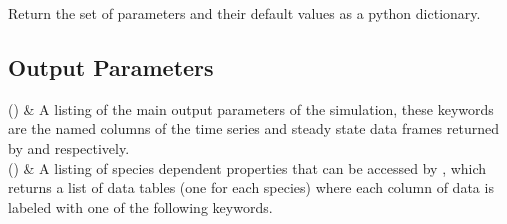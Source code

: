 \documentclass[letterpaper,10pt,english,openany,oneside]{sphinxmanual}
\begin{document}
\begin{fulllineitems}
\begin{fulllineitems}
\label{\detokenize{api/pytb.parameters.WrapParameters.get_params:pytb.parameters.WrapParameters.get_params}}
\pysigstartsignatures
{}
\pysigstopsignatures
\sphinxAtStartPar
Return the set of parameters and their default values
as a python dictionary.

\end{fulllineitems}


\end{fulllineitems}



\subsection{Output Parameters}
\label{\detokenize{params:output-parameters}}\label{\detokenize{params:output-params}}

\begin{savenotes}\sphinxattablestart
\sphinxthistablewithglobalstyle
\sphinxthistablewithnovlinesstyle
\centering
\begin{tabulary}{\linewidth}[t]{}
\sphinxtoprule
\sphinxtableatstartofbodyhook
\sphinxAtStartPar
{\hyperref[\detokenize{api/pytb.parameters.OutputParameters:pytb.parameters.OutputParameters}]{}}()
&
\sphinxAtStartPar
A listing of the main output parameters of the simulation, these keywords are the named columns of the time series and steady state data frames returned by {\hyperref[\detokenize{api/pytb.ThunderBoltz.get_timeseries:pytb.ThunderBoltz.get_timeseries}]{}} and {\hyperref[\detokenize{api/pytb.ThunderBoltz.get_ss_params:pytb.ThunderBoltz.get_ss_params}]{}} respectively.
\\
\sphinxhline
\sphinxAtStartPar
{\hyperref[\detokenize{api/pytb.parameters.ParticleParameters:pytb.parameters.ParticleParameters}]{}}()
&
\sphinxAtStartPar
A listing of species dependent properties that can be accessed by {\hyperref[\detokenize{api/pytb.ThunderBoltz.get_particle_tables:pytb.ThunderBoltz.get_particle_tables}]{}}, which returns a list of data tables (one for each species) where each column of data is labeled with one of the following keywords.
\\
\sphinxbottomrule
\end{tabulary}
\sphinxtableafterendhook\par
\sphinxattableend\end{savenotes}
\end{document}
